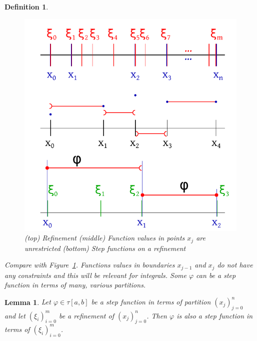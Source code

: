\documentclass{article}
\newtheorem{definition}{Definition}  \numberwithin{definition}{section}
\newtheorem{lemma}{Lemma}  \numberwithin{lemma}{section}
\begin{document}
\begin{definition}
  \begin{figure}[h]
    \begin{center}
      \includegraphics{img/10_refinement.pdf}
      \caption{(top) Refinement (middle) Function values in points $x_j$ are unrestricted (bottom) Step functions on a refinement}
      \label{img:refine}
    \end{center}
  \end{figure}

  Compare with Figure~\ref{img:refine}.
  Functions values in boundaries $x_{j-1}$ and $x_j$ do not have any constraints and this will be relevant for integrals.
  Some $\varphi$ can be a step function in terms of many, various partitions.
\end{definition}

\begin{lemma}
  Let $\varphi \in \tau[a,b]$ be a step function in terms of partition $(x_j)_{j=0}^n$
  and let $(\xi_i)_{i=0}^m$ be a refinement of $(x_j)_{j=0}^n$.
  Then $\varphi$ is also a step function in terms of $(\xi_i)_{i=0}^m$.
\end{lemma}
\end{document}
